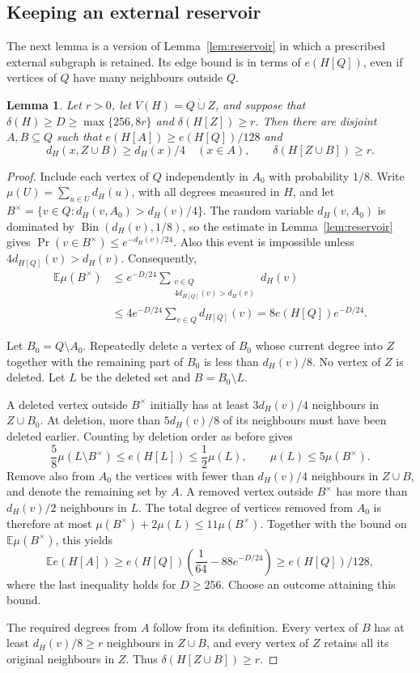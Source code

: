 \documentclass[10pt,letterpaper]{article}
\newtheorem{lemma}[theorem]{Lemma}
\theoremstyle{definition}
\theoremstyle{remark}
\newcommand{\dcup}{\mathbin{\dot\cup}}
\begin{document}
\subsection{Keeping an external reservoir}

The next lemma is a version of Lemma~\ref{lem:reservoir} in which a prescribed external subgraph is retained. Its edge bound is in terms of $e(H[Q])$, even if vertices of $Q$ have many neighbours outside $Q$.

\begin{lemma}\label{lem:anchored}
Let $r>0$, let $V(H)=Q\dcup Z$, and suppose that $\delta(H)\ge D\ge\max\{256,8r\}$ and $\delta(H[Z])\ge r$. Then there are disjoint $A,B\subseteq Q$ such that $e(H[A])\ge e(H[Q])/128$ and
\[
d_H(x,Z\cup B)\ge d_H(x)/4\quad(x\in A),\qquad
\delta(H[Z\cup B])\ge r.
\]
\end{lemma}
\begin{proof}
Include each vertex of $Q$ independently in $A_0$ with probability $1/8$. Write $\mu(U)=\sum_{u\in U}d_H(u)$, with all degrees measured in $H$, and let $B^{\times}=\{v\in Q:d_H(v,A_0)>d_H(v)/4\}$. The random variable $d_H(v,A_0)$ is dominated by $\operatorname{Bin}(d_H(v),1/8)$, so the estimate in Lemma~\ref{lem:reservoir} gives \mbox{$\Pr(v\in B^{\times})\le e^{-d_H(v)/24}$}. Also this event is impossible unless $4d_{H[Q]}(v)>d_H(v)$. Consequently,
\[
\begin{aligned}
\mathbb E\mu(B^{\times})
&\le e^{-D/24}\sum_{\substack{v\in Q\\4d_{H[Q]}(v)>d_H(v)}}d_H(v)\\
&\le4e^{-D/24}\sum_{v\in Q}d_{H[Q]}(v)
=8e(H[Q])e^{-D/24}.
\end{aligned}
\]

Let $B_0=Q\setminus A_0$. Repeatedly delete a vertex of $B_0$ whose current degree into $Z$ together with the remaining part of $B_0$ is less than $d_H(v)/8$. No vertex of $Z$ is deleted. Let $L$ be the deleted set and $B=B_0\setminus L$.

A deleted vertex outside $B^{\times}$ initially has at least $3d_H(v)/4$ neighbours in $Z\cup B_0$. At deletion, more than $5d_H(v)/8$ of its neighbours must have been deleted earlier. Counting by deletion order as before gives
\[
\frac58\mu(L\setminus B^{\times})\le e(H[L])\le\frac12\mu(L),
\qquad \mu(L)\le5\mu(B^{\times}).
\]
Remove also from $A_0$ the vertices with fewer than $d_H(v)/4$ neighbours in $Z\cup B$, and denote the remaining set by $A$. A removed vertex outside $B^{\times}$ has more than $d_H(v)/2$ neighbours in $L$. The total degree of vertices removed from $A_0$ is therefore at most $\mu(B^{\times})+2\mu(L)\le11\mu(B^{\times})$. Together with the bound on $\mathbb E\mu(B^{\times})$, this yields
\[
\mathbb E e(H[A])\ge e(H[Q])\left(\frac1{64}-88e^{-D/24}\right)
\ge e(H[Q])/128,
\]
where the last inequality holds for $D\ge256$. Choose an outcome attaining this bound.

The required degrees from $A$ follow from its definition. Every vertex of $B$ has at least $d_H(v)/8\ge r$ neighbours in $Z\cup B$, and every vertex of $Z$ retains all its original neighbours in $Z$. Thus \mbox{$\delta(H[Z\cup B])\ge r$}.
\end{proof}
\end{document}
